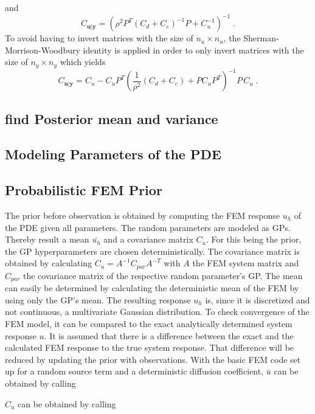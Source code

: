 \documentclass[%
  a4paper,oneside,%
  11pt,%
  smallchapters,
  green,%
  rgb, <cmyk>
  ]{tubsbook}
\begin{document}
and
\begin{equation}
C_{\bm{u}|\bm{y}} = \left(      \rho^2  P^T   (C_d + C_e)^{-1}  P  +  C_u^{-1}    \right)^{-1} \;.
\end{equation}
To avoid having to invert matrices with the size of $n_u \times n_u$, the Sherman-Morrison-Woodbury identity \cite{riedel1992} is applied \cite{girolami2021} in order to only invert matrices with the size of $n_y \times n_y$ which yields
\begin{equation}
C_{\bm{u}|\bm{y}} = C_u - C_u P^T (\frac{1}{\rho^2} (C_d + C_e) + P C_u P^T)^{-1} P\,C_u \;.
\end{equation}

\subsection{find Posterior mean and variance}


\subsection{Modeling Parameters of the PDE}

\subsection{Probabilistic FEM Prior}
The prior before observation is obtained by computing the FEM response $u_h$ of the PDE given all parameters. The random parameters are modeled as GPs. Thereby result a mean $\bar{u_h}$ and a covariance matrix $C_u$. For this being the prior, the GP hyperparameters are chosen deterministically. The covariance matrix is obtained by calculating $C_u = A^{-1} C_{par} A^{-T}$ with $A$ the FEM system matrix and $C_{par}$ the covariance matrix of the respective random parameter's GP. The mean can easily be determined by calculating the deterministic mean of the FEM by using only the GP's mean.
The resulting response $u_h$ is, since it is discretized and not continuous, a multivariate Gaussian distribution.
%
To check convergence of the FEM model, it can be compared to the exact analytically determined system response $u$. 
%
It is assumed that there is a difference between the exact and the calculated FEM response to the true system response. That difference will be reduced by updating the prior with observations.
%
With the basic FEM code set up for a random source term and a deterministic diffusion coefficient, $\bar{u}$ can be obtained by calling


$C_u$ can be obtained by calling
\end{document}
